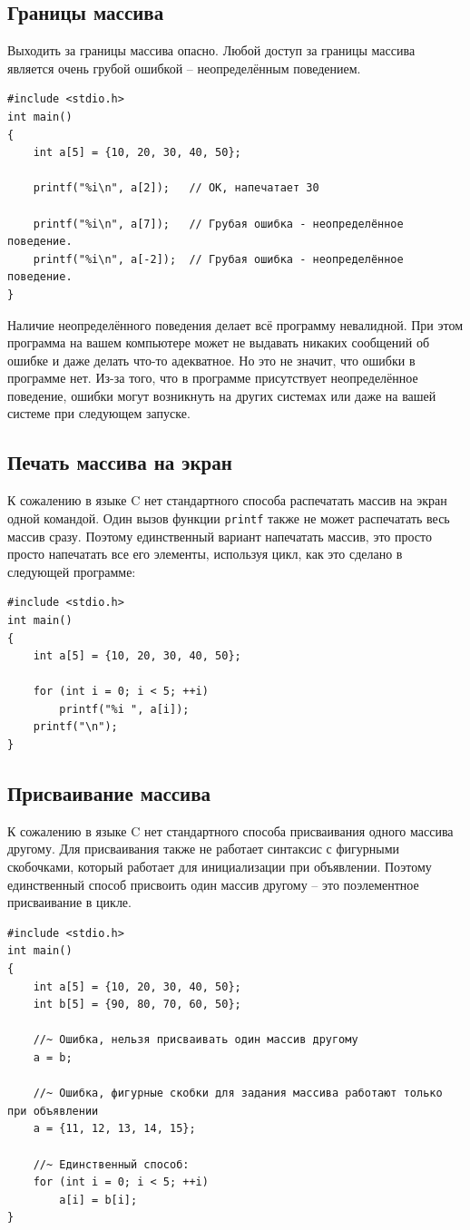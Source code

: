\documentclass{article}
\begin{document}
\subsection*{Границы массива}
Выходить за границы массива опасно. Любой доступ за границы массива является очень грубой ошибкой -- неопределённым поведением.
\begin{lstlisting}
#include <stdio.h>
int main()
{
	int a[5] = {10, 20, 30, 40, 50};
	
	printf("%i\n", a[2]); 	// ОК, напечатает 30
	
	printf("%i\n", a[7]); 	// Грубая ошибка - неопределённое поведение.
	printf("%i\n", a[-2]); 	// Грубая ошибка - неопределённое поведение.
}
\end{lstlisting}
Наличие неопределённого поведения делает всё программу невалидной. При этом программа на вашем компьютере может не выдавать никаких сообщений об ошибке и даже делать что-то адекватное. Но это не значит, что ошибки в программе нет. Из-за того, что в программе присутствует неопределённое поведение, ошибки могут возникнуть на других системах или даже на вашей системе при следующем запуске. 

\subsection*{Печать массива на экран}
К сожалению в языке C нет стандартного способа распечатать массив на экран одной командой.
Один вызов функции \texttt{printf} также не может распечатать весь массив сразу.
Поэтому единственный вариант напечатать массив, это просто просто напечатать все его элементы, используя цикл, как это сделано в следующей программе:
\begin{lstlisting}
#include <stdio.h>
int main()
{
    int a[5] = {10, 20, 30, 40, 50};

    for (int i = 0; i < 5; ++i)
        printf("%i ", a[i]);
    printf("\n");
}
\end{lstlisting}

\subsection*{Присваивание массива}
К сожалению в языке C нет стандартного способа присваивания одного массива другому. Для присваивания также не работает синтаксис с фигурными скобочками, который работает для инициализации при объявлении. Поэтому единственный способ присвоить один массив другому -- это поэлементное присваивание в цикле.
\begin{lstlisting}
#include <stdio.h>
int main()
{
    int a[5] = {10, 20, 30, 40, 50};
    int b[5] = {90, 80, 70, 60, 50};

	//~ Ошибка, нельзя присваивать один массив другому
	a = b;	
	
	//~	Ошибка, фигурные скобки для задания массива работают только при объявлении			
    a = {11, 12, 13, 14, 15};	
    
    //~ Единственный способ:
    for (int i = 0; i < 5; ++i)
    	a[i] = b[i];
}
\end{lstlisting}
\end{document}
